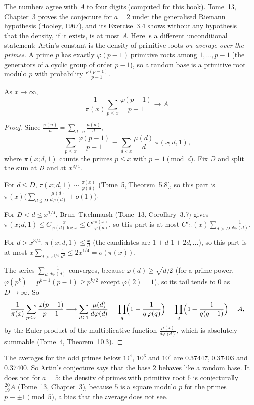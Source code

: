 The numbers agree with $A$ to four digits (computed for this book). Tome~13, Chapter~3 proves the conjecture for $a=2$ under the generalised Riemann
hypothesis (Hooley, 1967), and its Exercise~3.4 shows without any hypothesis that the density, if it exists, is at most $A$. Here is a different unconditional
statement: Artin's constant is the density of primitive roots \emph{on average over the primes}. A prime $p$ has exactly $\varphi(p-1)$ primitive roots among
$1,\dots,p-1$ (the generators of a cyclic group of order $p-1$), so a random base is a primitive root modulo $p$ with probability $\frac{\varphi(p-1)}{p-1}$.

\begin{theorem}\label{thm:artinavg}
As $x\to\infty$,
\[
\frac1{\pi(x)}\sum_{p\le x}\frac{\varphi(p-1)}{p-1}\longrightarrow A .
\]
\end{theorem}
\begin{proof}
Since $\frac{\varphi(n)}n=\sum_{d\mid n}\frac{\mu(d)}d$,
\[
\sum_{p\le x}\frac{\varphi(p-1)}{p-1}=\sum_{d<x}\frac{\mu(d)}d\,\pi(x;d,1),
\]
where $\pi(x;d,1)$ counts the primes $p\le x$ with $p\equiv1\pmod d$. Fix $D$ and split the sum at $D$ and at $x^{3/4}$.

For $d\le D$, $\pi(x;d,1)\sim\frac{\pi(x)}{\varphi(d)}$ (Tome~5, Theorem~5.8), so this part is $\pi(x)\bigl(\sum_{d\le D}\frac{\mu(d)}{d\varphi(d)}+o(1)\bigr)$.

For $D<d\le x^{3/4}$, Brun--Titchmarsh (Tome~13, Corollary~3.7) gives $\pi(x;d,1)\le C\frac x{\varphi(d)\log x}\le C'\frac{\pi(x)}{\varphi(d)}$, so this part is at
most $C'\pi(x)\sum_{d>D}\frac1{d\varphi(d)}$.

For $d>x^{3/4}$, $\pi(x;d,1)\le\frac xd$ (the candidates are $1+d,1+2d,\dots$), so this part is at most $x\sum_{d>x^{3/4}}\frac1{d^2}\le2x^{1/4}=o(\pi(x))$.

The series $\sum_d\frac1{d\varphi(d)}$ converges, because $\varphi(d)\ge\sqrt{d/2}$ (for a prime power, $\varphi(p^k)=p^{k-1}(p-1)\ge p^{k/2}$ except $\varphi(2)=1$), so its tail tends to $0$ as $D\to\infty$. So
\[
\frac1{\pi(x)}\sum_{p\le x}\frac{\varphi(p-1)}{p-1}\longrightarrow\sum_{d\ge1}\frac{\mu(d)}{d\varphi(d)}=\prod_q\Bigl(1-\frac1{q\,\varphi(q)}\Bigr)=\prod_q\Bigl(1-\frac1{q(q-1)}\Bigr)=A,
\]
by the Euler product of the multiplicative function $\frac{\mu(d)}{d\varphi(d)}$, which is absolutely summable (Tome~4, Theorem~10.3).
\end{proof}

The averages for the odd primes below $10^4$, $10^6$ and $10^7$ are $0.37447$, $0.37403$ and $0.37400$. So Artin's conjecture says that the base $2$ behaves like a
random base. It does not for $a=5$: the density of primes with primitive root $5$ is conjecturally $\frac{20}{19}A$ (Tome~13, Chapter~3), because $5$ is a square modulo $p$ for
the primes $p\equiv\pm1\pmod5$, a bias that the average does not see.

